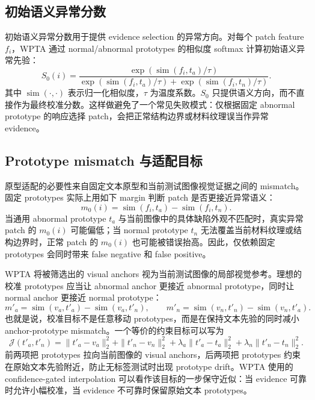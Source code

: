 \documentclass[runningheads]{llncs}
\newcommand{\simi}{\operatorname{sim}}
\begin{document}
\subsection{初始语义异常分数}

初始语义异常分数用于提供 evidence selection 的异常方向。对每个 patch feature $f_i$，WPTA 通过 normal/abnormal prototypes 的相似度 softmax 计算初始语义异常先验：
\begin{equation}
S_0(i)=
\frac{\exp(\simi(f_i,t_a)/\tau)}
{\exp(\simi(f_i,t_a)/\tau)+\exp(\simi(f_i,t_n)/\tau)} .
\end{equation}
其中 $\simi(\cdot,\cdot)$ 表示归一化相似度，$\tau$ 为温度系数。$S_0$ 只提供语义方向，而不直接作为最终校准分数。这样做避免了一个常见失败模式：仅根据固定 abnormal prototype 的响应选择 patch，会把正常结构边界或材料纹理误当作异常 evidence。

\subsection{Prototype mismatch 与适配目标}

原型适配的必要性来自固定文本原型和当前测试图像视觉证据之间的 mismatch。固定 prototypes 实际上用如下 margin 判断 patch 是否更接近异常语义：
\begin{equation}
m_0(i)=\simi(f_i,t_a)-\simi(f_i,t_n).
\end{equation}
当通用 abnormal prototype $t_a$ 与当前图像中的具体缺陷外观不匹配时，真实异常 patch 的 $m_0(i)$ 可能偏低；当 normal prototype $t_n$ 无法覆盖当前材料纹理或结构边界时，正常 patch 的 $m_0(i)$ 也可能被错误抬高。因此，仅依赖固定 prototypes 会同时带来 false negative 和 false positive。

WPTA 将被筛选出的 visual anchors 视为当前测试图像的局部视觉参考。理想的校准 prototypes 应当让 abnormal anchor 更接近 abnormal prototype，同时让 normal anchor 更接近 normal prototype：
\begin{equation}
m'_a=\simi(v_a,t'_a)-\simi(v_a,t'_n),\qquad
m'_n=\simi(v_n,t'_n)-\simi(v_n,t'_a).
\end{equation}
也就是说，校准目标不是任意移动 prototypes，而是在保持文本先验的同时减小 anchor-prototype mismatch。一个等价的约束目标可以写为
\begin{equation}
\mathcal{J}(t'_a,t'_n)=
\|t'_a-v_a\|_2^2+\|t'_n-v_n\|_2^2+
\lambda_a\|t'_a-t_a\|_2^2+
\lambda_n\|t'_n-t_n\|_2^2 .
\end{equation}
前两项把 prototypes 拉向当前图像的 visual anchors，后两项把 prototypes 约束在原始文本先验附近，防止无标签测试时出现 prototype drift。WPTA 使用的 confidence-gated interpolation 可以看作该目标的一步保守近似：当 evidence 可靠时允许小幅校准，当 evidence 不可靠时保留原始文本 prototypes。
\end{document}
